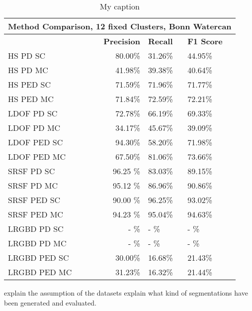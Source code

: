 \begin{table}[]
\centering
\begin{tabular}{|l|r|l|l|}
\hline
\multicolumn{4}{|c|}{Method Comparison, 12 fixed Clusters, Bonn Watercan}                        \\ \hline
              & \textbf{Precision} & \textbf{Recall} & \textbf{F1 Score} \\ \hline
HS PD SC  & 80.00\%   & 31.26\%     & 44.95\%  \\ \hline
HS PD MC  & 41.98\%   & 39.38\%     & 40.64\%  \\ \hline              
HS PED SC  & 71.59\%   & 71.96\%     & 71.77\%  \\ \hline
HS PED MC  & 71.84\%   & 72.59\%     & 72.21\%  \\ \hline            
LDOF PD SC  & 72.78\%   & 66.19\%     & 69.33\%  \\ \hline
LDOF PD MC  & 34.17\%   & 45.67\%     & 39.09\%  \\ \hline              
LDOF PED SC  & 94.30\%   & 58.20\%     & 71.98\%  \\ \hline
LDOF PED MC  & 67.50\%   & 81.06\%     & 73.66\%  \\ \hline
SRSF PD SC & 96.25 \%   & 83.03\%     & 89.15\%  \\ \hline
SRSF PD MC & 95.12 \%   & 86.96\%     & 90.86\%  \\ \hline
SRSF PED SC & 90.00 \%   & 96.25\%     & 93.02\%  \\ \hline
SRSF PED MC & 94.23 \%   & 95.04\%     & 94.63\%  \\ \hline
LRGBD PD SC & - \%   & - \%     & - \%  \\ \hline
LRGBD PD MC & - \%   & - \%     & - \%  \\ \hline
LRGBD PED SC & 30.00\%   & 16.68\%     & 21.43\%  \\ \hline
LRGBD PED MC & 31.23\%   & 16.32\%     & 21.44\%  \\ \hline
\end{tabular}
\caption[Method Comparission Bonn Watercan]{My caption}
\label{tab:bonn_wc_methods}
\end{table}








explain the assumption of the datasets
explain what kind of segmentations have been generated and evaluated.







